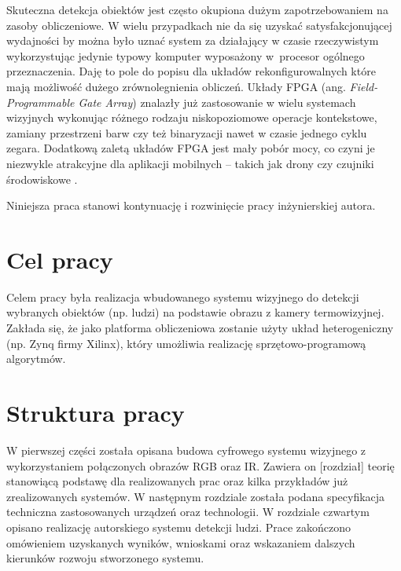 Skuteczna detekcja obiektów jest często okupiona dużym zapotrzebowaniem na zasoby obliczeniowe. 
W wielu przypadkach nie da się uzyskać satysfakcjonującej wydajności by można było uznać system za działający w czasie rzeczywistym wykorzystując jedynie typowy komputer wyposażony w~procesor ogólnego przeznaczenia.
Daję to pole do popisu dla układów rekonfigurowalnych które mają możliwość dużego zrównolegnienia obliczeń. %
Układy FPGA (ang. \textit{Field-Programmable Gate Array}) znalazły już zastosowanie w wielu systemach wizyjnych wykonując różnego rodzaju niskopoziomowe operacje kontekstowe, zamiany przestrzeni barw czy też binaryzacji nawet w czasie jednego cyklu zegara. 
Dodatkową zaletą układów FPGA jest mały pobór mocy, co czyni je niezwykle atrakcyjne dla  aplikacji mobilnych -- takich jak drony czy czujniki środowiskowe \cite{garcia2014survey}. 

Niniejsza praca stanowi kontynuację i rozwinięcie pracy inżynierskiej autora.

\section{Cel pracy}


Celem pracy była realizacja wbudowanego systemu wizyjnego do detekcji wybranych obiektów (np. ludzi) na podstawie obrazu z kamery termowizyjnej. %
Zakłada się, że jako platforma obliczeniowa zostanie użyty układ heterogeniczny (np. Zynq firmy Xilinx), który umożliwia realizację sprzętowo-programową algorytmów.

\section{Struktura pracy}


W pierwszej części została opisana budowa cyfrowego systemu wizyjnego z wykorzystaniem połączonych obrazów RGB oraz IR. 
Zawiera on [rozdział] teorię stanowiącą podstawę dla realizowanych prac oraz kilka przykładów już zrealizowanych systemów. 
W następnym rozdziale została podana specyfikacja techniczna zastosowanych urządzeń oraz technologii. %
W rozdziale czwartym opisano realizację autorskiego systemu detekcji ludzi. 
Prace zakończono omówieniem uzyskanych wyników, wnioskami oraz wskazaniem dalszych kierunków rozwoju stworzonego systemu.